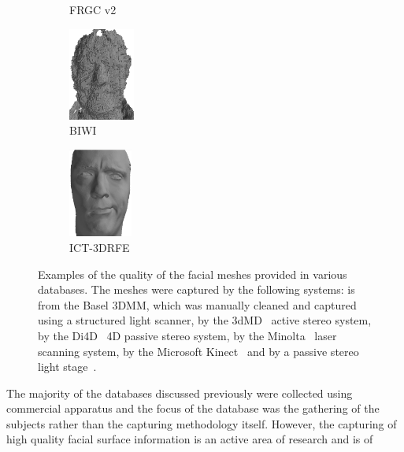 \begin{figure}[ht]
\begin{subfigure}[b]{0.3\textwidth}
		\caption{FRGC v2~\cite{phillips2005overview}}\label{fig:db_examples_frgc}
	\end{subfigure}
	\begin{subfigure}[b]{0.3\textwidth}
		\centering
		\includegraphics[height=1.2in]{background/images/biwi}
		\caption{BIWI~\cite{fanelli2013random}}\label{fig:db_examples_biwi}
	\end{subfigure}
	\begin{subfigure}[b]{0.32\textwidth}
		\centering
		\includegraphics[height=1.15in]{background/images/ict}
		\caption{ICT-3DRFE~\cite{stratou2012exploring}}\label{fig:db_examples_ict}
	\end{subfigure}
	\caption{Examples of the quality of the facial meshes provided in various
	         databases. The meshes were captured by the following systems:
	          is from the Basel 3DMM,
	         which was manually cleaned and captured using a structured light
	         scanner,  by the
	         3dMD~\cite{3dmd} active stereo system,
	          by the
	         Di4D~\cite{di4d} 4D passive stereo system,
	          by the
	         Minolta~\cite{minolta} laser scanning system,
	          by the
	         Microsoft Kinect~\cite{zhang2012microsoft} and
	          by a passive stereo
	         light stage~\cite{debevec2000acquiring}.}
\label{fig:db_examples}
\end{figure}
The majority of the databases discussed previously were collected using
commercial apparatus and the focus of the database was the gathering of the
subjects rather than the capturing methodology itself. However, the capturing of
high quality facial surface information is an active area of research and is of
